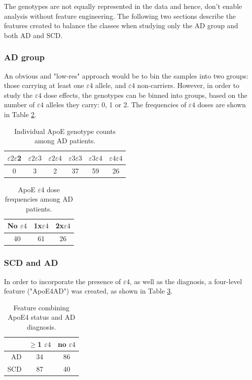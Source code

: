 \documentclass{amsart}
\theoremstyle{plain}
\begin{document}
The genotypes are not equally represented in the data and hence, don't enable analysis without feature engineering. The following two sections describe the features created to balance the classes when studying only the AD group and both AD and SCD.
\subsubsection{AD group}
An obvious and "low-res" approach would be to bin the samples into two groups: those carrying at least one $\varepsilon4$ allele, and $\varepsilon4$ non-carriers. However, in order to study the $\varepsilon4$ dose effects, the genotypes can be binned into groups, based on the number of $\varepsilon4$ alleles they carry: 0, 1 or 2. The frequencies of $\varepsilon4$ doses are shown in Table \ref{Table:E4binAD}.

\begin{table}[h!]
\begin{tabular}{cccccc} \toprule
$\varepsilon2\varepsilon$2 & $\varepsilon2\varepsilon3$ & $\varepsilon2\varepsilon4$ & $\varepsilon3\varepsilon3$ & $\varepsilon3\varepsilon4$ & $\varepsilon4\varepsilon4$ \\ \midrule
0    & 3    & 2    & 37   & 59   & 26 \\ \bottomrule
\end{tabular}
\caption{Individual ApoE genotype counts among AD patients.} \label{Table:ApoEfreqAD}
\end{table}

\begin{table}[h!]
\begin{tabular}{ccc} \toprule
No $\varepsilon4$  & 1x$\varepsilon4$& 2x$\varepsilon4$\\ \midrule
40    & 61   & 26 \\ \bottomrule
\end{tabular}
\caption{ApoE $\varepsilon4$ dose frequencies among AD patients.} \label{Table:E4binAD}
\end{table}

\subsubsection{SCD and AD}\label{Meth_target}
In order to incorporate the presence of $\varepsilon4$, as well as the diagnosis, a four-level feature ("ApoE4AD") was created, as shown in Table \ref{Table:target}.

\begin{table}[h!]
\begin{tabular}{rcc} \toprule
& $\geq$1 $\varepsilon4$ & no $\varepsilon4$\\ \midrule
AD \vline  & 34& 86\\
 SCD \vline & 87& 40\\ \bottomrule 
\end{tabular}
\caption{Feature combining ApoE4 status and AD diagnosis.} \label{Table:target}
\end{table}
   
\end{document}
